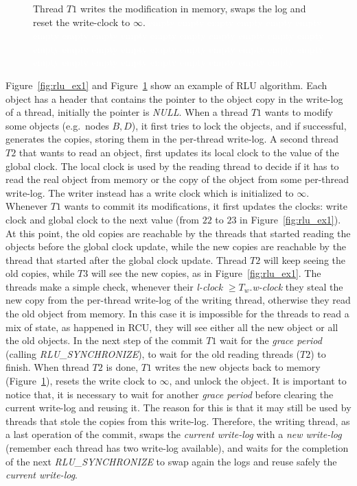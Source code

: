 \begin{refsection}
\begin{figure}[t]
\begin{minipage}[b]{0.47\textwidth}
\begin{flushright}
      \caption{Thread $T1$ writes the modification in memory, swaps the log
        and reset the write-clock to $\infty$. \textcolor{white}{empty empty
          empty empty empty empty empty empty empty empty empty empty empty
          empty empty empty empty empty empty empty empty empty empty empty
          empty empty empty empty empty empty empty empty empty empty empty}}
      \label{fig:rlu_ex2}
    \end{flushright}
  \end{minipage}
  \vspace{-10pt}
\end{figure}

Figure~\ref{fig:rlu_ex1} and Figure~\ref{fig:rlu_ex2} show an example of RLU
algorithm.
%
Each object has a header that contains the pointer to the object copy in the
write-log of a thread, initially the pointer is \emph{NULL}.
%
When a thread $T1$ wants to modify some objects (e.g.\ nodes $B,D$), it first
tries to lock the objects, and if successful, generates the copies, storing
them in the per-thread write-log.
%
A second thread $T2$ that wants to read an object, first updates its local
clock to the value of the global clock.
%
The local clock is used by the reading thread to decide if it has to read the
real object from memory or the copy of the object from some per-thread
write-log.
%
The writer instead has a write clock which is initialized to $\infty$.
%
Whenever $T1$ wants to commit its modifications, it first updates the clocks:
write clock and global clock to the next value (from $22$ to $23$ in
Figure~\ref{fig:rlu_ex1}).
%
At this point, the old copies are reachable by the threads that started
reading the objects before the global clock update, while the new copies are
reachable by the thread that started after the global clock update.
%
Thread $T2$ will keep seeing the old copies, while $T3$ will see the new
copies, as in Figure~\ref{fig:rlu_ex1}.
%
The threads make a simple check, whenever their \emph{l-clock}
$\geq T_w$.\emph{w-clock} they steal the new copy from the per-thread
write-log of the writing thread, otherwise they read the old object from
memory.
%
In this case it is impossible for the threads to read a mix of state, as
happened in RCU, they will see either all the new object or all the old
objects.
%
In the next step of the commit $T1$ wait for the \emph{grace period} (calling
\emph{RLU\_SYNCHRONIZE}), to wait for the old reading threads ($T2$) to
finish.
%
When thread $T2$ is done, $T1$ writes the new objects back to memory
(Figure~\ref{fig:rlu_ex2}), resets the write clock to $\infty$, and unlock the
object.
%
It is important to notice that, it is necessary to wait for another
\emph{grace period} before clearing the current write-log and reusing it.
%
The reason for this is that it may still be used by threads that stole the
copies from this write-log.
%
Therefore, the writing thread, as a last operation of the commit, swaps the
\emph{current write-log} with a \emph{new write-log} (remember each thread has
two write-log available), and waits for the completion of the next
\emph{RLU\_SYNCHRONIZE} to swap again the logs and reuse safely the
\emph{current write-log}.


\end{refsection}
